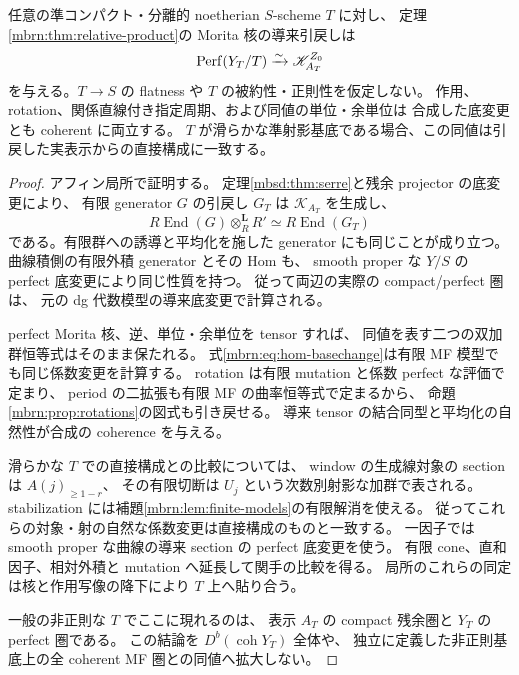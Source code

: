 \begin{corollary}
\label{mbrn:cor:base-change}
任意の準コンパクト・分離的 noetherian $S$-scheme $T$ に対し、
定理\ref{mbrn:thm:relative-product}の Morita 核の導来引戻しは
\begin{equation}\label{mbrn:eq:basechange}
 \operatorname{Perf}(Y_T/T)\xrightarrow{\sim}\mathscr K_{A_T}^{Z_0}
\end{equation}
を与える。$T\to S$ の flatness や $T$ の被約性・正則性を仮定しない。
作用、rotation、関係直線付き指定周期、および同値の単位・余単位は
合成した底変更とも coherent に両立する。
$T$ が滑らかな準射影基底である場合、この同値は引戻した実表示からの直接構成に一致する。
\end{corollary}
\begin{proof}
アフィン局所で証明する。
定理\ref{mbsd:thm:serre}と残余 projector の底変更により、
有限 generator $G$ の引戻し $G_T$ は $\mathscr K_{A_T}$ を生成し、
\[
 R\operatorname{End}(G)\otimes_R^{\mathbf L}R'
      \simeq R\operatorname{End}(G_T)
\]
である。有限群への誘導と平均化を施した generator にも同じことが成り立つ。
曲線積側の有限外積 generator とその Hom も、
smooth proper な $Y/S$ の perfect 底変更により同じ性質を持つ。
従って両辺の実際の compact/perfect 圏は、
元の dg 代数模型の導来底変更で計算される。

perfect Morita 核、逆、単位・余単位を tensor すれば、
同値を表す二つの双加群恒等式はそのまま保たれる。
式\eqref{mbrn:eq:hom-basechange}は有限 MF 模型でも同じ係数変更を計算する。
rotation は有限 mutation と係数 perfect な評価で定まり、
period の二拡張も有限 MF の曲率恒等式で定まるから、
命題\ref{mbrn:prop:rotations}の図式も引き戻せる。
導来 tensor の結合同型と平均化の自然性が合成の coherence を与える。

滑らかな $T$ での直接構成との比較については、
window の生成線対象の section は $A(j)_{\geq1-r}$、
その有限切断は $U_j$ という次数別射影な加群で表される。
stabilization には補題\ref{mbrn:lem:finite-models}の有限解消を使える。
従ってこれらの対象・射の自然な係数変更は直接構成のものと一致する。
一因子では smooth proper な曲線の導来 section の perfect 底変更を使う。
有限 cone、直和因子、相対外積と mutation へ延長して関手の比較を得る。
局所のこれらの同定は核と作用写像の降下により $T$ 上へ貼り合う。

一般の非正則な $T$ でここに現れるのは、
表示 $A_T$ の compact 残余圏と $Y_T$ の perfect 圏である。
この結論を $D^b(\operatorname{coh}Y_T)$ 全体や、
独立に定義した非正則基底上の全 coherent MF 圏との同値へ拡大しない。
\end{proof}

